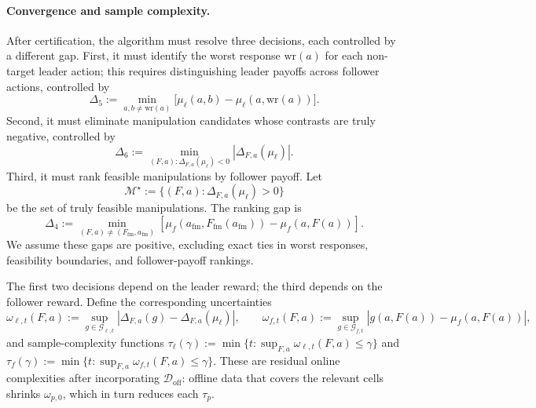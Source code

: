 \documentclass{article}
\newcommand{\cG}{\mathcal{G}}
\newcommand{\cD}{\mathcal{D}}
\begin{document}
\paragraph{Convergence and sample complexity.}
After certification, the algorithm must resolve three decisions, each controlled by a different gap. First, it must identify the worst response $\mathrm{wr}(a)$ for each non-target leader action; this requires distinguishing leader payoffs across follower actions, controlled by 
\[
    \Delta_5:=\min_{a,b\neq\mathrm{wr}(a)}
    \bigl[\mu_\ell(a,b)-\mu_\ell(a,\mathrm{wr}(a))\bigr].
\]
Second, it must eliminate manipulation candidates whose contrasts are truly negative, controlled by 
\[
    \Delta_6:=\min_{(F,a):\Delta_{F,a}(\mu_\ell)<0}
    |\Delta_{F,a}(\mu_\ell)|.
\]
Third, it must rank feasible manipulations by follower payoff. Let
\[
    \mathcal M^\star:=\{(F,a):\Delta_{F,a}(\mu_\ell)>0\}
\] be the set of truly feasible manipulations. The ranking gap is
$$\Delta_4:=\min_{(F,a)\neq(F_{\mathrm{fm}},a_{\mathrm{fm}})}[\mu_f(a_{\mathrm{fm}},F_{\mathrm{fm}}(a_{\mathrm{fm}}))-\mu_f(a,F(a))].$$
We assume these gaps are positive, excluding exact ties in worst responses, feasibility boundaries, and follower-payoff rankings.

The first two decisions depend on the leader reward; the third depends on the follower reward. Define the corresponding uncertainties
\[
\omega_{\ell,t}(F,a):=\sup_{g\in\cG_{\ell,t}}|\Delta_{F,a}(g)-\Delta_{F,a}(\mu_\ell)|,
\qquad
\omega_{f,t}(F,a):=\sup_{g\in\cG_{f,t}}|g(a,F(a))-\mu_f(a,F(a))|,
\]
and sample-complexity functions $\tau_\ell(\gamma):=\min\{t:\sup_{F,a}\omega_{\ell,t}(F,a)\le\gamma\}$ and $\tau_f(\gamma):=\min\{t:\sup_{F,a}\omega_{f,t}(F,a)\le\gamma\}$. These are residual online complexities after incorporating $\cD_{\mathrm{off}}$: offline data that covers the relevant cells shrinks $\omega_{p,0}$, which in turn reduces each $\tau_p$.
\end{document}
